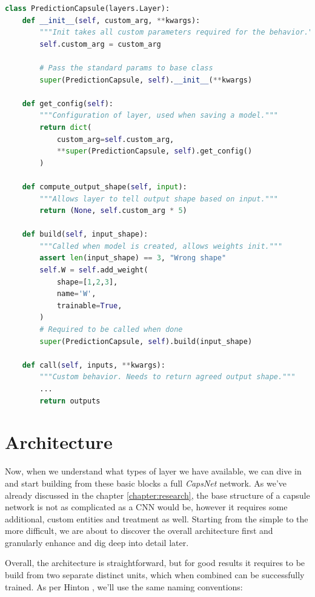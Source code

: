 \begin{lstlisting}[language=Python, caption=Custom layer example]
class PredictionCapsule(layers.Layer):
    def __init__(self, custom_arg, **kwargs):
        """Init takes all custom parameters required for the behavior."""
        self.custom_arg = custom_arg

        # Pass the standard params to base class
        super(PredictionCapsule, self).__init__(**kwargs)

    def get_config(self):
        """Configuration of layer, used when saving a model."""
        return dict(
            custom_arg=self.custom_arg,
            **super(PredictionCapsule, self).get_config()
        )

    def compute_output_shape(self, input):
        """Allows layer to tell output shape based on input."""
        return (None, self.custom_arg * 5)

    def build(self, input_shape):
        """Called when model is created, allows weights init."""
        assert len(input_shape) == 3, "Wrong shape"
        self.W = self.add_weight(
            shape=[1,2,3],
            name='W',
            trainable=True,
        )
        # Required to be called when done
        super(PredictionCapsule, self).build(input_shape)

    def call(self, inputs, **kwargs):
        """Custom behavior. Needs to return agreed output shape."""
        ...
        return outputs

\end{lstlisting}


\section{Architecture}

Now, when we understand what types of layer we have available, we can dive in and start building from these basic blocks a full \textit{CapsNet} network. As we've already discussed in the chapter \ref{chapter:research}, the base structure of a capsule network is not as complicated as a CNN would be, however it requires some additional, custom entities and treatment as well. Starting from the simple to the more difficult, we are about to discover the overall architecture first and granularly enhance and dig deep into detail later.

Overall, the architecture is straightforward, but for good results it requires to be build from two separate distinct units, which when combined can be successfully trained. As per Hinton \cite{capsule}, we'll use the same naming conventions:

